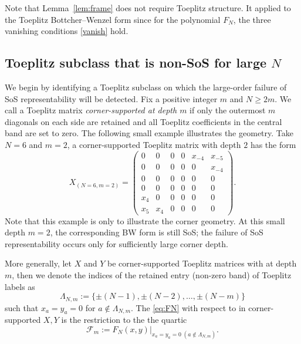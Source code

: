 Note that Lemma~\ref{lem:frame} does not require Toeplitz structure. It applied to the Toeplitz Bottcher--Wenzel form since for the polynomial $F_N$, the three vanishing conditions
\eqref{vanish} hold.

\subsection{Toeplitz subclass that is non-SoS for large $N$}
\label{subsec:corner}

We begin by identifying a Toeplitz subclass on which the large-order
failure of SoS representability will be detected.  Fix a positive integer $m$ and
 $N\ge 2m$.  We call a Toeplitz matrix
\emph{corner-supported at depth $m$} if only the outermost $m$
diagonals on each side are retained and all Toeplitz coefficients in
the central band are set to zero.
The following small example illustrates the geometry.
Take $N=6$ and $m=2$, a corner-supported Toeplitz matrix with depth $2$ has the form
\begin{equation}\label{eq:corner-example-matrix}
X_{(N=6,m=2)}
=
\begin{pmatrix}
0&0&0&0&x_{-4}&x_{-5}\\
0&0&0&0&0&x_{-4}\\
0&0&0&0&0&0\\
0&0&0&0&0&0\\
x_4&0&0&0&0&0\\
x_5&x_4&0&0&0&0
\end{pmatrix}.
\end{equation}
Note that this example is only to illustrate the corner
geometry.  At this small depth $m=2$, the corresponding BW form is
still SoS; the failure of SoS representability occurs only for sufficiently large corner
depth. 

More generally, let $X$ and $Y$ be corner-supported Toeplitz matrices with at depth $m$, then we denote the indices of the retained entry (non-zero band) of Toeplitz labels as
\[
 \Lambda_{N,m}
 :=
 \{\pm(N-1), \pm (N-2), \dotsc, \pm(N-m)\}
\]
such that $ x_a=y_a=0$ for $a \notin \Lambda_{N,m}$.
The \eqref{eq:FN} with respect to in corner-supported $X,Y$ is the restriction to the the quartic
\begin{equation}\label{eq:Bm-definition}
 \mathcal F_m
 :=
 F_N(x,y)\Big|_{
 x_a=y_a=0\;(a\notin\Lambda_{N,m})}.
\end{equation}

